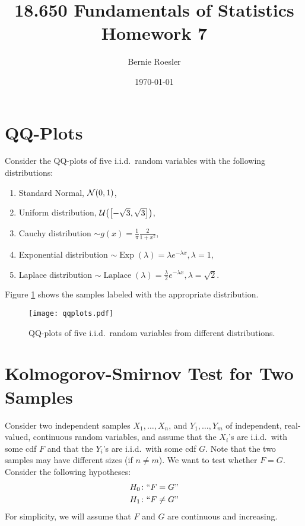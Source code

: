\documentclass[letterpaper, oneside, reqno]{amsart}
\title[Homework 7 -- Problem \thesection]{18.650 Fundamentals of Statistics\\{\large Homework 7}}
\author{Bernie Roesler}
\date{\today}
\numberwithin{equation}{section}
\newcommand{\N}[2]{\mathcal{N}\mleft( #1, #2 \mright)}
\newcommand{\U}[2]{\mathcal{U}\mleft(\mleft[ #1, #2 \mright]\mright)}
\newcommand{\iid}{i.i.d.}
\begin{document}

\graphicspath{{./figures/}}

\maketitle

\section{QQ-Plots}
Consider the QQ-plots of five \iid\ random variables with the following
distributions:
\begin{enumerate}
\item Standard Normal, $\N{0}{1}$,
  \item Uniform distribution, $\U{-\sqrt{3}}{\sqrt{3}}$,
  \item Cauchy distribution $\sim g(x) = \frac{1}{\pi}\frac{2}{1+x^2}$,
  \item Exponential distribution $\sim \operatorname{Exp}(\lambda) = \lambda
    e^{-\lambda x}, \lambda = 1$,
  \item Laplace distribution $\sim \operatorname{Laplace}(\lambda)
    = \frac{\lambda}{2} e^{-\lambda x}, \lambda = \sqrt{2}$.
\end{enumerate}
Figure \ref{fig:qqplots} shows the samples labeled with the appropriate
distribution.

\begin{figure}[!h]
  \centering
  \texttt{[image: qqplots.pdf]}
  \caption{QQ-plots of five \iid\ random variables from different distributions.}
  \label{fig:qqplots}
\end{figure}

\clearpage
\section{Kolmogorov-Smirnov Test for Two Samples}
Consider two independent samples $X_1, \dots, X_n$, and $Y_1, \dots, Y_m$ of
independent, real-valued, continuous random variables, and assume that the $X_i$'s
are \iid\ with some cdf $F$ and that the $Y_i$'s are \iid\ with some cdf $G$. Note that the
two samples may have different sizes (if $n \ne m$). We want to test whether $F = G$.
Consider the following hypotheses:
\begin{align*}
  H_0 \colon ``F = G" \\
  H_1 \colon ``F \ne G"
\end{align*}
For simplicity, we will assume that $F$ and $G$ are continuous and increasing.
\end{document}
